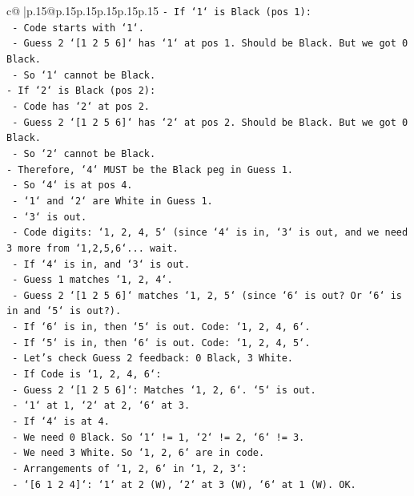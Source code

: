\documentclass{article}
\begin{document}
{\begin{supertabular}{c@{$\;$}|p{.15\linewidth}@{}p{.15\linewidth}p{.15\linewidth}p{.15\linewidth}p{.15\linewidth}p{.15\linewidth}}
{{{\texttt{{-} If `1` is Black (pos 1):} \\
\texttt{  {-} Code starts with `1`.} \\
\texttt{  {-} Guess 2 `{[}1 2 5 6{]}` has `1` at pos 1. Should be Black. But we got 0 Black.} \\
\texttt{  {-} So `1` cannot be Black.} \\
\texttt{{-} If `2` is Black (pos 2):} \\
\texttt{  {-} Code has `2` at pos 2.} \\
\texttt{  {-} Guess 2 `{[}1 2 5 6{]}` has `2` at pos 2. Should be Black. But we got 0 Black.} \\
\texttt{  {-} So `2` cannot be Black.} \\
\texttt{{-} Therefore, `4` MUST be the Black peg in Guess 1.} \\
\texttt{  {-} So `4` is at pos 4.} \\
\texttt{  {-} `1` and `2` are White in Guess 1.} \\
\texttt{  {-} `3` is out.} \\
\texttt{  {-} Code digits: `1, 2, 4, 5` (since `4` is in, `3` is out, and we need 3 more from `1,2,5,6`... wait.} \\
\texttt{  {-} If `4` is in, and `3` is out.} \\
\texttt{  {-} Guess 1 matches `1, 2, 4`.} \\
\texttt{  {-} Guess 2 `{[}1 2 5 6{]}` matches `1, 2, 5` (since `6` is out? Or `6` is in and `5` is out?).} \\
\texttt{  {-} If `6` is in, then `5` is out. Code: `1, 2, 4, 6`.} \\
\texttt{  {-} If `5` is in, then `6` is out. Code: `1, 2, 4, 5`.} \\
\texttt{  {-} Let's check Guess 2 feedback: 0 Black, 3 White.} \\
\texttt{  {-} If Code is `1, 2, 4, 6`:} \\
\texttt{    {-} Guess 2 `{[}1 2 5 6{]}`: Matches `1, 2, 6`. `5` is out.} \\
\texttt{    {-} `1` at 1, `2` at 2, `6` at 3.} \\
\texttt{    {-} If `4` is at 4.} \\
\texttt{    {-} We need 0 Black. So `1` != 1, `2` != 2, `6` != 3.} \\
\texttt{    {-} We need 3 White. So `1, 2, 6` are in code.} \\
\texttt{    {-} Arrangements of `1, 2, 6` in `1, 2, 3`:} \\
\texttt{      {-} `{[}6 1 2 4{]}`: `1` at 2 (W), `2` at 3 (W), `6` at 1 (W). OK.} \\
}}}
\end{supertabular}}
\end{document}
